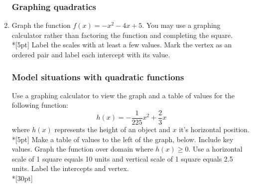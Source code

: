 \documentclass[12pt, oneside]{article}
\begin{document}
\begin{enumerate}
\newpage
\subsubsection*{Graphing quadratics}
\item Graph the function $f(x)=-x^2-4x+5$. You may use a graphing calculator rather than factoring the function and completing the square.\\*[5pt]
Label the scales with at least a few values. Mark the vertex as an ordered pair and label each intercept with its value.\\

\begin{center} %
\end{center}

\newpage
\subsubsection*{Model situations with quadratic functions}

Use a graphing calculator to view the graph and a table of values for the following function:
\[h(x)=-\frac{1}{225}x^2+\frac{2}{3}x\]
where $h(x)$ represents the height of an object and $x$ it's horizontal position.\\*[5pt]
Make a table of values to the left of the graph, below. Include key values. Graph the function over domain where $h(x) \geq 0$. Use a horizontal scale of 1 square equals 10 units and vertical scale of 1 square equals 2.5 units. Label the intercepts and vertex.\\*[30pt]


\end{enumerate}
\end{document}
